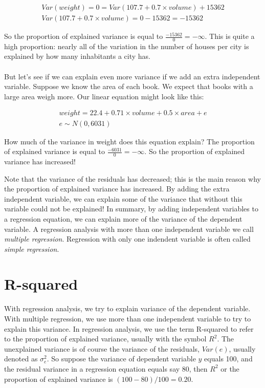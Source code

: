 \documentclass[]{report}\usepackage[]{graphicx}\usepackage[]{color}
\begin{document}
\begin{eqnarray}
Var(weight) =  0=   Var(107.7 + 0.7 \times  volume) + 15362 \nonumber\\
Var(107.7 + 0.7 \times  volume) = 0- 15362= -15362\nonumber
\end{eqnarray}

So the proportion of explained variance is equal to $ \frac{-15362}{0}=\ensuremath{-\infty{}}$. This is quite a high proportion: nearly all of the variation in the number of houses per city is explained by how many inhabitants a city has.
\\
\\
But let's see if we can explain even more variance if we add an extra independent variable. Suppose we know the area of each book. We expect that books with a large area weigh more. Our linear equation might look like this:


\begin{eqnarray}
weight = 22.4 + 0.71 \times volume + 0.5 \times  area + e \\
e \sim N(0, 6031)
\end{eqnarray}

How much of the variance in weight does this equation explain? The proportion of explained variance is equal to $ \frac{-6031}{0}=\ensuremath{-\infty{}}$. So the proportion of explained variance has increased!

Note that the variance of the residuals has decreased; this is the main reason why the proportion of explained variance has increased. By adding the extra independent variable, we can explain some of the variance that without this variable could not be explained! In summary, by adding independent variables to a regression equation, we can explain more of the variance of the dependent variable. A regression analysis with more than one independent variable we call \textit{multiple regression}. Regression with only one indendent variable is often called \textit{simple regression}.







\section{R-squared}

With regression analysis, we try to explain variance of the dependent variable. With multiple regression, we use more than one independent variable to try to explain this variance. In regression analysis, we use the term R-squared to refer to the proportion of explained variance, usually with the symbol $R^2$. The unexplained variance is of course the variance of the residuals, $Var(e)$, usually denoted as $\sigma_e^2$. So suppose the variance of dependent variable $y$ equals 100, and the residual variance in a regression equation equals say 80, then $R^2$ or the proportion of explained variance is $(100-80)/100=0.20$.
\end{document}
